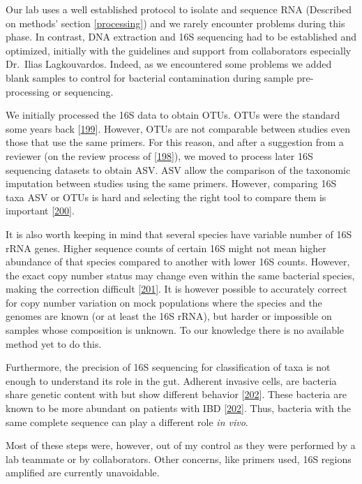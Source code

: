 \documentclass[
  12pt,
  a4paper,
  twoside,
  openright]{book}
\begin{document}
Our lab uses a well established protocol to isolate and sequence RNA (Described on methods' section \ref{processing}) and we rarely encounter problems during this phase.
In contrast, DNA extraction and 16S sequencing had to be established and optimized, initially with the guidelines and support from collaborators especially Dr.~Ilias Lagkouvardos.
Indeed, as we encountered some problems we added blank samples to control for bacterial contamination during sample pre-processing or sequencing.

We initially processed the 16S data to obtain OTUs.
OTUs were the standard some years back {[}\protect\hyperlink{ref-callahan2017}{199}{]}.
However, OTUs are not comparable between studies even those that use the same primers.
For this reason, and after a suggestion from a reviewer (on the review process of {[}\protect\hyperlink{ref-revilla2021}{198}{]}), we moved to process later 16S sequencing datasets to obtain ASV.
ASV allow the comparison of the taxonomic imputation between studies using the same primers.
However, comparing 16S taxa ASV or OTUs is hard and selecting the right tool to compare them is important {[}\protect\hyperlink{ref-nearing2022}{200}{]}.

It is also worth keeping in mind that several species have variable number of 16S rRNA genes.
Higher sequence counts of certain 16S might not mean higher abundance of that species compared to another with lower 16S counts.
However, the exact copy number status may change even within the same bacterial species, making the correction difficult {[}\protect\hyperlink{ref-louca2018}{201}{]}.
It is however possible to accurately correct for copy number variation on mock populations where the species and the genomes are known (or at least the 16S rRNA), but harder or impossible on samples whose composition is unknown.
To our knowledge there is no available method yet to do this.

Furthermore, the precision of 16S sequencing for classification of taxa is not enough to understand its role in the gut.
Adherent invasive cells, are bacteria share genetic content with but show different behavior {[}\protect\hyperlink{ref-nadalian2021}{202}{]}.
These bacteria are known to be more abundant on patients with IBD {[}\protect\hyperlink{ref-nadalian2021}{202}{]}.
Thus, bacteria with the same complete sequence can play a different role \emph{in vivo}.

Most of these steps were, however, out of my control as they were performed by a lab teammate or by collaborators.
Other concerns, like primers used, 16S regions amplified are currently unavoidable.
\end{document}
